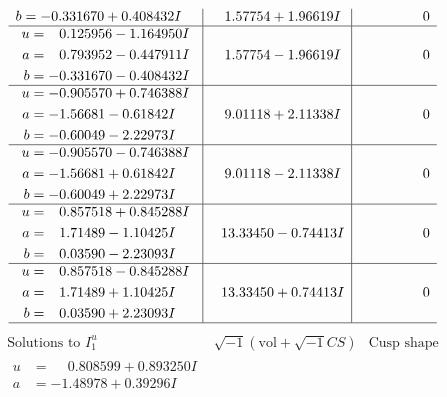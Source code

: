 \documentclass[1p]{elsarticle_modified}
\theoremstyle{definition}
\newcommand{\I}{\sqrt{-1}}
\begin{document}
$$\begin{array}{c|c|c}
\begin{aligned}
b &= -0.331670 + 0.408432 I\end{aligned}
 & \phantom{-}1.57754 + 1.96619 I & \phantom{-0.000000 } 0 \\ \hline\begin{aligned}
u &= \phantom{-}0.125956 - 1.164950 I \\
a &= \phantom{-}0.793952 - 0.447911 I \\
b &= -0.331670 - 0.408432 I\end{aligned}
 & \phantom{-}1.57754 - 1.96619 I & \phantom{-0.000000 } 0 \\ \hline\begin{aligned}
u &= -0.905570 + 0.746388 I \\
a &= -1.56681 - 0.61842 I \\
b &= -0.60049 - 2.22973 I\end{aligned}
 & \phantom{-}9.01118 + 2.11338 I & \phantom{-0.000000 } 0 \\ \hline\begin{aligned}
u &= -0.905570 - 0.746388 I \\
a &= -1.56681 + 0.61842 I \\
b &= -0.60049 + 2.22973 I\end{aligned}
 & \phantom{-}9.01118 - 2.11338 I & \phantom{-0.000000 } 0 \\ \hline\begin{aligned}
u &= \phantom{-}0.857518 + 0.845288 I \\
a &= \phantom{-}1.71489 - 1.10425 I \\
b &= \phantom{-}0.03590 - 2.23093 I\end{aligned}
 & \phantom{-}13.33450 - 0.74413 I & \phantom{-0.000000 } 0 \\ \hline\begin{aligned}
u &= \phantom{-}0.857518 - 0.845288 I \\
a &= \phantom{-}1.71489 + 1.10425 I \\
b &= \phantom{-}0.03590 + 2.23093 I\end{aligned}
 & \phantom{-}13.33450 + 0.74413 I & \phantom{-0.000000 } 0\\
 \hline 
 \end{array}$$\newpage$$\begin{array}{c|c|c}  
\text{Solutions to }I^u_{1}& \I (\text{vol} + \sqrt{-1}CS) & \text{Cusp shape}\\
 \hline 
\begin{aligned}
u &= \phantom{-}0.808599 + 0.893250 I \\
a &= -1.48978 + 0.39296 I \\

\end{aligned}
\end{array}$$
\end{document}
